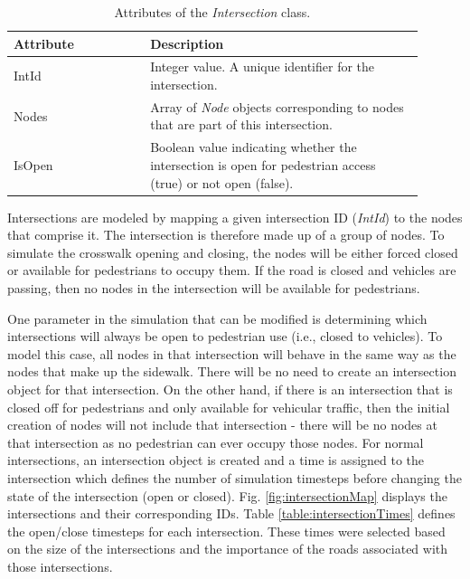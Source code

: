\documentclass[12pt]{article}
\begin{document}
\def\arraystretch{1.5}
\begin{table}[hb!]
  \centering
    \begin{tabular}{p{0.3\linewidth}p{0.6\linewidth}}
     \hline
     Attribute & Description \\
     \hline
     IntId & Integer value. A unique identifier for the intersection. \\
     Nodes & Array of \textit{Node} objects corresponding to nodes
             that are part of this intersection. \\
     IsOpen  & Boolean value indicating whether the intersection is open
             for pedestrian access (true) or not open (false). \\
     \hline
    \end{tabular}
    \caption{Attributes of the \textit{Intersection} class.}
  \label{table:intersection}
\end{table}

Intersections are modeled by mapping a given intersection ID (\textit{IntId})
to the nodes that comprise it. The intersection is therefore made up of a
group of nodes. To simulate the crosswalk opening and closing, the nodes will
be either forced closed or available for pedestrians to occupy them. If the
road is closed and vehicles are passing, then no nodes in the intersection
will be available for pedestrians.

One parameter in the simulation that can be modified is determining which
intersections will always be open to pedestrian use (i.e., closed to vehicles).
To model this case, all nodes in that intersection will behave
in the same way as the nodes that make up the sidewalk. There will be no need to
create an intersection object for that intersection. On the other hand, if there
is an intersection that is closed off for pedestrians and only available for
vehicular traffic, then the initial creation of nodes will not include that
intersection - there will be no nodes at that intersection as no pedestrian can
ever occupy those nodes.
For normal intersections, an intersection object is created and a time is
assigned to the intersection which defines the number of simulation timesteps
before changing the state of the intersection (open or closed). Fig.
\ref{fig:intersectionMap} displays the intersections and their corresponding
IDs. Table \ref{table:intersectionTimes} defines the open/close timesteps for
each intersection. These times were selected based on the size of the
intersections and the importance of the roads associated with those
intersections.
\end{document}
